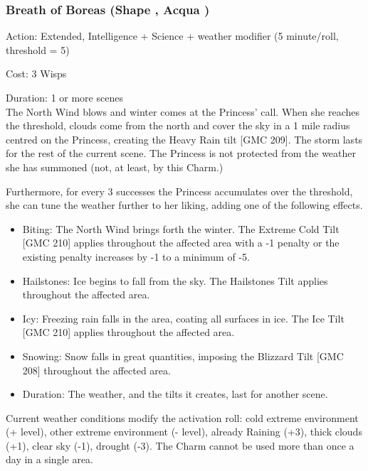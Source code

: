 \subsubsection*{Breath of Boreas (Shape \textbullet\textbullet\textbullet\textbullet, Acqua \textbullet\textbullet\textbullet)}

\noindent Action: Extended, Intelligence + Science + weather modifier (5 minute/roll, threshold = 5)

\noindent Cost: 3 Wisps

\noindent Duration: 1 or more scenes\\

\noindent The North Wind blows and winter comes at the Princess' call. When she reaches the threshold, clouds come from the north and cover the sky in a 1 mile radius centred on the Princess, creating the Heavy Rain tilt [GMC 209]. The storm lasts for the rest of the current scene. The Princess is not protected from the weather she has summoned (not, at least, by this Charm.)

Furthermore, for every 3 successes the Princess accumulates over the threshold, she can tune the weather further to her liking, adding one of the following effects.

\begin{itemize}
    \item Biting: The North Wind brings forth the winter. The Extreme Cold Tilt [GMC 210] applies throughout the affected area with a -1 penalty or the existing penalty increases by -1 to a minimum of -5.
    \item Hailstones: Ice begins to fall from the sky. The Hailstones Tilt applies throughout the affected area. 
    \item Icy: Freezing rain falls in the area, coating all surfaces in ice. The Ice Tilt [GMC 210] applies throughout the affected area.
    \item Snowing: Snow falls in great quantities, imposing the Blizzard Tilt [GMC 208] throughout the affected area.
    \item Duration: The weather, and the tilts it creates, last for another scene.\end{itemize}
                                                                            
 
Current weather conditions modify the activation roll: cold extreme environment (+ level), other extreme environment (- level), already Raining (+3), thick clouds (+1), clear sky (-1), drought (-3). The Charm cannot be used more
than once a day in a single area.

